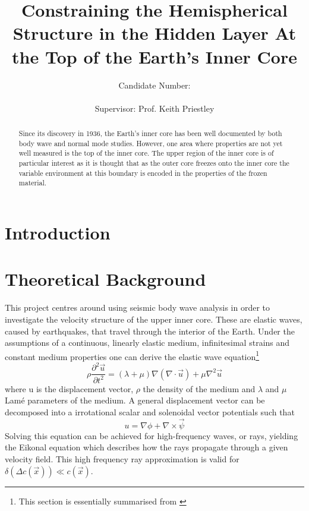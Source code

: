 \documentclass[11pt,a4paper]{article}
\begin{document}
\title{Constraining the Hemispherical Structure in the Hidden Layer At the Top of the Earth's Inner Core}
\author{Candidate Number: \\  \\ Supervisor: Prof. Keith Priestley}
\maketitle

\begin{abstract}
Since its discovery in 1936, the Earth's inner core has been well documented by both body wave and normal mode studies. However, one area where properties are not yet well measured is the top of the inner core. The upper region of the inner core is of particular interest as it is thought that as the outer core freezes onto the inner core the variable environment at this boundary is encoded in the properties of the frozen material. 
\end{abstract}

\tableofcontents

\newpage
\section{Introduction}

\section{Theoretical Background}
This project centres around using seismic body wave analysis in order to investigate the velocity structure of the upper inner core. These are elastic waves, caused by earthquakes, that travel through the interior of the Earth. Under the assumptions of a continuous, linearly elastic medium, infinitesimal strains and constant medium properties one can derive the elastic wave equation\footnote{This section is essentially summarised from \cite{Shearer2009}}
\begin{equation}
	\rho \frac{\partial^{2} \vec{u}}{\partial t^{2}} = \left ( \lambda + \mu \right ) \nabla \left ( \nabla \cdot \vec{u} \right ) + \mu \nabla^{2} \vec{u}
	\label{eq:Wave Equation}
\end{equation}
where u is the displacement vector, $\rho$ the density of the medium and $\lambda$ and $\mu$  Lam\'{e} parameters of the medium. A general displacement vector can be decomposed into a irrotational scalar and solenoidal vector potentials such that
\begin{equation}
	u = \nabla \phi + \nabla \times \vec{\psi}
	\label{eq:Displacement}
\end{equation}
Solving this equation can be achieved for high-frequency waves, or rays, yielding the Eikonal equation which describes how the rays propagate through a given velocity field. This high frequency ray approximation is valid for $\delta \left ( \Delta c \left ( \vec{x} \right ) \right ) \ll c \left ( \vec{x} \right )$.
\end{document}
